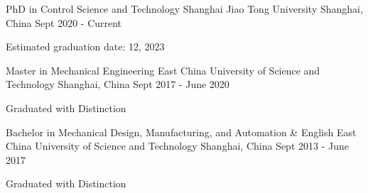 

\begin{cventries}

  \cventry
    {PhD in Control Science and Technology} %
    {Shanghai Jiao Tong University} %
    {Shanghai, China} %
    {Sept 2020 - Current} %
    {
      \begin{cvitems} %
        \item {Estimated graduation date: 12, 2023}
      \end{cvitems}
    }
    
  \cventry
    {Master in Mechanical Engineering} %
    {East China University of Science and Technology} %
    {Shanghai, China} %
    {Sept 2017 - June 2020} %
    {
      \begin{cvitems} %
        \item {Graduated with Distinction}
      \end{cvitems}
    }
    
  \cventry
    {Bachelor in Mechanical Design, Manufacturing, and Automation \& English} %
    {East China University of Science and Technology} %
    {Shanghai, China} %
    {Sept 2013 - June 2017} %
    {
      \begin{cvitems} %
        \item {Graduated with Distinction}
      \end{cvitems}
    }
\end{cventries}
